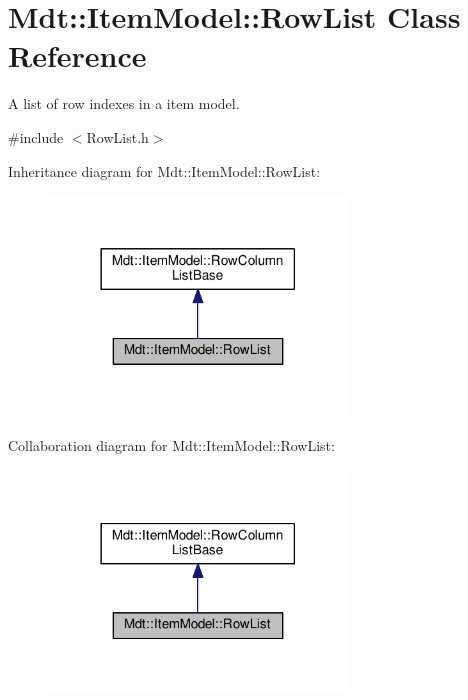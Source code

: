 \hypertarget{class_mdt_1_1_item_model_1_1_row_list}{}\section{Mdt\+:\+:Item\+Model\+:\+:Row\+List Class Reference}
\label{class_mdt_1_1_item_model_1_1_row_list}


A list of row indexes in a item model.  




{\ttfamily \#include $<$Row\+List.\+h$>$}



Inheritance diagram for Mdt\+:\+:Item\+Model\+:\+:Row\+List\+:
\nopagebreak
\begin{figure}[H]
\begin{center}
\leavevmode
\includegraphics[width=225pt]{class_mdt_1_1_item_model_1_1_row_list__inherit__graph}
\end{center}
\end{figure}


Collaboration diagram for Mdt\+:\+:Item\+Model\+:\+:Row\+List\+:
\nopagebreak
\begin{figure}[H]
\begin{center}
\leavevmode
\includegraphics[width=225pt]{class_mdt_1_1_item_model_1_1_row_list__coll__graph}
\end{center}
\end{figure}
